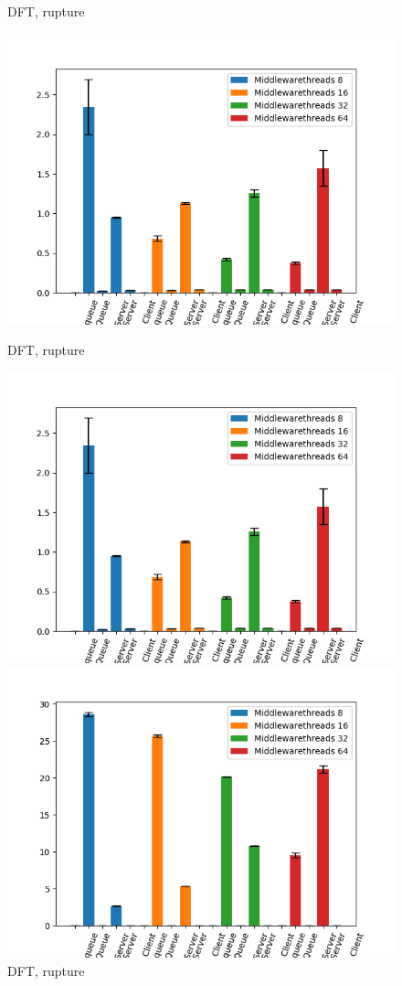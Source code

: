 \documentclass[11pt,a4paper]{article}
\begin{document}
\begin{figure}[!ht]
\begin{minipage}[b]{0.5\linewidth}
    \caption{DFT, rupture} 
    \vspace{4ex}
  \end{minipage} 
    \begin{minipage}[b]{0.5\linewidth}
    \centering
    \includegraphics[width=0.7\linewidth]{img/exp3_1/exp3_1_mw_percentile_plots_writes_1__vc_8.png} 
    \caption{DFT, rupture} 
    \vspace{4ex}
  \end{minipage} 
    \begin{minipage}[b]{0.5\linewidth}
    \centering
    \includegraphics[width=0.7\linewidth]{img/exp3_1/exp3_1_mw_percentile_plots_writes_1__vc_8.png} 
    \caption{DFT, rupture} 
    \vspace{4ex}
  \end{minipage} 
    \begin{minipage}[b]{0.5\linewidth}
    \centering
    \includegraphics[width=0.7\linewidth]{img/exp3_1/exp3_1_mw_percentile_plots_writes_0__vc_16.png} 

\end{minipage}
\end{figure}
\end{document}
